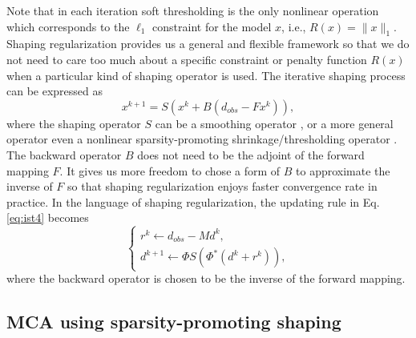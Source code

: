 Note that in each iteration soft thresholding is the only nonlinear operation which corresponds to the $\ell_1$ constraint for the model $x$, i.e., $R(x)=\|x\|_1$.
 Shaping regularization \citep{fomel2007shaping,fomel2008nonlinear} provides us a general and flexible framework so that we do not need to care too much about a specific constraint or penalty function $R(x)$ when a particular kind of shaping operator is used. The iterative shaping process can be expressed as
 \begin{equation}\label{eq:shaping1}
   x^{k+1}=S(x^{k}+B(d_{obs}-Fx^{k})),
 \end{equation}
where the shaping operator $S$ can be a smoothing operator \citep{fomel2007shaping}, or a more general operator even  a nonlinear sparsity-promoting shrinkage/thresholding operator \citep{fomel2008nonlinear}. The backward operator $B$ does not need to be the adjoint of the forward mapping $F$. It gives us more freedom to chose a form of $B$ to approximate the inverse of $F$ so that shaping regularization enjoys faster convergence rate in practice. In the language of shaping regularization, the updating rule in Eq. \eqref{eq:ist4} becomes
\begin{equation}\label{eq:shaping2}
  \left\{
  \begin{array}{l}
    r^{k}\leftarrow d_{obs}-Md^{k}, \\
    d^{k+1}\leftarrow \Phi S(\Phi^{*}(d^{k}+r^{k})),
  \end{array}
  \right.
\end{equation}
where the backward operator is chosen to be the inverse of the forward mapping.

 
\subsection{MCA using sparsity-promoting shaping}

